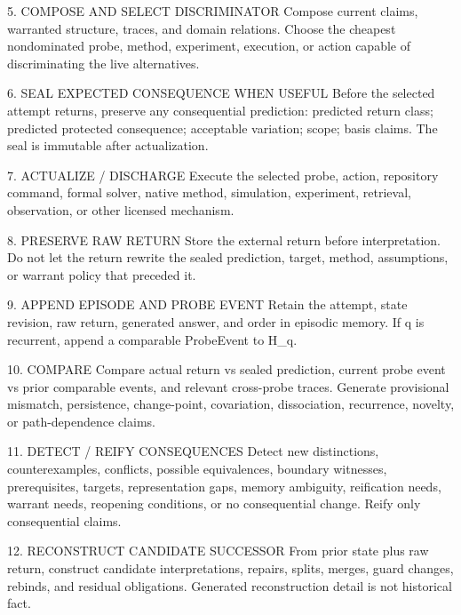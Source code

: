 \documentclass[
]{article}
\newenvironment{Shaded}{}{}
\newcommand{\NormalTok}[1]{#1}
\begin{document}
\begin{Shaded}
\begin{Highlighting}[]
\NormalTok{5. COMPOSE AND SELECT DISCRIMINATOR}
\NormalTok{   Compose current claims, warranted structure, traces, and domain relations.}
\NormalTok{   Choose the cheapest nondominated probe, method, experiment, execution,}
\NormalTok{   or action capable of discriminating the live alternatives.}

\NormalTok{6. SEAL EXPECTED CONSEQUENCE WHEN USEFUL}
\NormalTok{   Before the selected attempt returns, preserve any consequential prediction:}
\NormalTok{       predicted return class; predicted protected consequence;}
\NormalTok{       acceptable variation; scope; basis claims.}
\NormalTok{   The seal is immutable after actualization.}

\NormalTok{7. ACTUALIZE / DISCHARGE}
\NormalTok{   Execute the selected probe, action, repository command, formal solver,}
\NormalTok{   native method, simulation, experiment, retrieval, observation, or other}
\NormalTok{   licensed mechanism.}

\NormalTok{8. PRESERVE RAW RETURN}
\NormalTok{   Store the external return before interpretation.}
\NormalTok{   Do not let the return rewrite the sealed prediction, target, method,}
\NormalTok{   assumptions, or warrant policy that preceded it.}

\NormalTok{9. APPEND EPISODE AND PROBE EVENT}
\NormalTok{   Retain the attempt, state revision, raw return, generated answer, and order}
\NormalTok{   in episodic memory. If q is recurrent, append a comparable ProbeEvent to H_q.}

\NormalTok{10. COMPARE}
\NormalTok{    Compare actual return vs sealed prediction, current probe event vs prior}
\NormalTok{    comparable events, and relevant cross-probe traces.}
\NormalTok{    Generate provisional mismatch, persistence, change-point, covariation,}
\NormalTok{    dissociation, recurrence, novelty, or path-dependence claims.}

\NormalTok{11. DETECT / REIFY CONSEQUENCES}
\NormalTok{    Detect new distinctions, counterexamples, conflicts, possible equivalences,}
\NormalTok{    boundary witnesses, prerequisites, targets, representation gaps, memory}
\NormalTok{    ambiguity, reification needs, warrant needs, reopening conditions, or no}
\NormalTok{    consequential change. Reify only consequential claims.}

\NormalTok{12. RECONSTRUCT CANDIDATE SUCCESSOR}
\NormalTok{    From prior state plus raw return, construct candidate interpretations,}
\NormalTok{    repairs, splits, merges, guard changes, rebinds, and residual obligations.}
\NormalTok{    Generated reconstruction detail is not historical fact.}


\end{Highlighting}
\end{Shaded}
\end{document}
